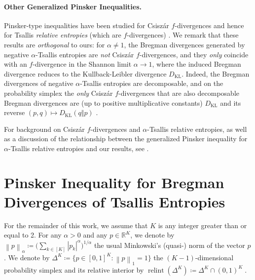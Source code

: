 \documentclass[11pt,oneside,a4paper]{article}
\newcommand{\R}{\mathbb{R}}
\newcommand{\lrb}[1]{\left(#1\right)}
\newcommand{\brb}[1]{\bigl(#1\bigr)}
\newcommand{\bcb}[1]{\bigl\{#1\bigr\}}
\newcommand{\labs}[1]{\left\lvert#1\right\rvert}
\newcommand{\lno}[1]{\left\lVert#1\right\rVert}
\theoremstyle{plain}
\theoremstyle{definition}
\theoremstyle{remark}
\newcommand{\simplex}[1]{\Delta^{#1}}
\DeclareMathOperator*{\relint}{relint}
\newcommand{\KL}{D_{\mathrm{KL}}}
\begin{document}
\paragraph{Other Generalized Pinsker Inequalities.}
Pinsker-type inequalities have been studied for Csisz\'ar $f$-divergences and hence for Tsallis \emph{relative entropies} (which are $f$-divergences) \citep{ReidWilliamson2009GeneralisedPinsker,Gilardoni,rioul2023historical}.
We remark that these results are \emph{orthogonal} to ours: for $\alpha\neq 1$, the Bregman divergences generated by negative $\alpha$-Tsallis entropies are \emph{not} Csisz\'ar $f$-divergences, and they \emph{only} coincide with an $f$-divergence in the Shannon limit $\alpha\to 1$, where the induced Bregman divergence reduces to the Kullback-Leibler divergence $\KL$.
Indeed, the Bregman divergences of negative $\alpha$-Tsallis entropies are decomposable, and on the probability simplex the \emph{only} Csisz\'ar $f$-divergences that are also decomposable Bregman divergences are (up to positive multiplicative constants) $\KL$ and its reverse $(p,q)\mapsto\KL(q\Vert p)$ \citep{Amari_KL_Bregman_f_divergence}.

For background on Csisz\'ar $f$-divergences and $\alpha$-Tsallis relative entropies, as well as a discussion of the relationship between the generalized Pinsker inequality for $\alpha$-Tsallis relative entropies and 
our results, see .

\section{Pinsker Inequality for Bregman Divergences of Tsallis Entropies}
For the remainder of this work, we assume that $K$ is any integer greater than or equal to 2.
For any $\alpha > 0$ and any $p \in \R^K$, we denote by $\lno{p}_\alpha \coloneqq \brb{\sum_{k \in [K]} \labs{p_k}^\alpha}^{1/\alpha}$ the usual Minkowski's (quasi-) norm of the vector $p$.
We denote by 
$
    \simplex{K} 
\coloneqq 
    \bcb{ p\in [0,1]^K : \lno{p}_1=1 }
$
 the $(K-1)$-dimensional probability simplex
and its relative interior by
$
    \relint\lrb{\simplex{K}}
\coloneqq 
    \simplex{K} \cap(0,1)^K
\;.
$
\end{document}
